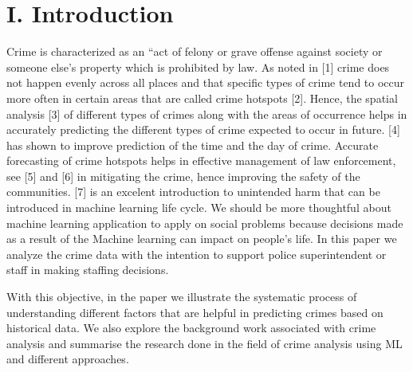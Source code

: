 \documentclass[10 pt,conference,final,]{IEEEtran}
\begin{document}



\maketitle


%
\IEEEpeerreviewmaketitle


\section{I. Introduction}\label{i.-introduction}

Crime is characterized as an ``act of felony or grave offense against
society or someone else's property which is prohibited by law. As noted
in {[}1{]} crime does not happen evenly across all places and that
specific types of crime tend to occur more often in certain areas that
are called crime hotspots {[}2{]}. Hence, the spatial analysis {[}3{]}
of different types of crimes along with the areas of occurrence helps in
accurately predicting the different types of crime expected to occur in
future. {[}4{]} has shown to improve prediction of the time and the day
of crime. Accurate forecasting of crime hotspots helps in effective
management of law enforcement, see {[}5{]} and {[}6{]} in mitigating the
crime, hence improving the safety of the communities. {[}7{]} is an
excelent introduction to unintended harm that can be introduced in
machine learning life cycle. We should be more thoughtful about machine
learning application to apply on social problems because decisions made
as a result of the Machine learning can impact on people's life. In this
paper we analyze the crime data with the intention to support police
superintendent or staff in making staffing decisions.

With this objective, in the paper we illustrate the systematic process
of understanding different factors that are helpful in predicting crimes
based on historical data. We also explore the background work associated
with crime analysis and summarise the research done in the field of
crime analysis using ML and different approaches.
\end{document}
